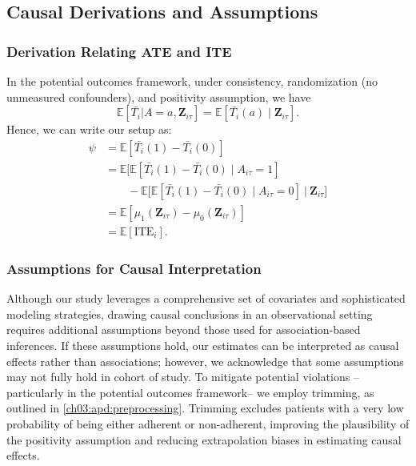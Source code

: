 \subsection{Causal Derivations and Assumptions}\ChThreeHeadingOnly
\label{ch03:apd:causal_derivations}




\subsubsection{Derivation Relating ATE and ITE}
\label{ch03:apd:ate-ite}

In the potential outcomes framework, under consistency, randomization (no unmeasured confounders), and positivity assumption, we have
\[
\mathbb{E}[\bar{T_i}|A=a, \mathbf{Z}_{i\tau}]=\mathbb{E}[\bar{T_i}(a) \mid \mathbf{Z}_{i\tau}].
\]
Hence, we can write our setup as:
\begin{align*}
\psi
    &= \mathbb{E}[\bar{T_i}(1) - \bar{T_i}(0)] \\
    &= \mathbb{E}\big[\mathbb{E}[\bar{T_i}(1) - \bar{T_i}(0) \mid A_{i\tau} = 1]\\
    &\quad \quad- \mathbb{E}[\mathbb{E}[\bar{T_i}(1) - \bar{T_i}(0) \mid A_{i\tau} = 0 ] ~\big|~ \mathbf{Z}_{i\tau}\big] \\
    &=\mathbb{E}[\mu_1(\mathbf{Z}_{i\tau})-\mu_0(\mathbf{Z}_{i\tau})] \\
    &=\mathbb{E}[\text{ITE}_i].
\end{align*}

\subsubsection{Assumptions for Causal Interpretation}
\label{ch03:adp:from_assoc_to_causal}
Although our study leverages a comprehensive set of covariates and sophisticated modeling strategies, drawing causal conclusions in an observational setting requires additional assumptions beyond those used for association-based inferences. 
If these assumptions hold, our estimates can be interpreted as causal effects rather than associations; however, we acknowledge that some assumptions may not fully hold in cohort of study. 
To mitigate potential violations --particularly in the potential outcomes framework-- we employ trimming, as outlined in \ref{ch03:apd:preprocessing}. 
Trimming excludes patients with a very low probability of being either adherent or non-adherent, improving the plausibility of the positivity assumption and reducing extrapolation biases in estimating causal effects.

